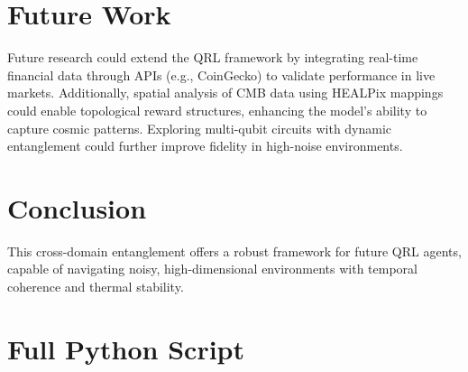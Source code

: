 \documentclass{article}
\begin{document}
\section{Future Work}
Future research could extend the QRL framework by integrating real-time financial data through APIs (e.g., CoinGecko) to validate performance in live markets. Additionally, spatial analysis of CMB data using HEALPix mappings could enable topological reward structures, enhancing the model’s ability to capture cosmic patterns. Exploring multi-qubit circuits with dynamic entanglement could further improve fidelity in high-noise environments.

\section{Conclusion}
This cross-domain entanglement offers a robust framework for future QRL agents, capable of navigating noisy, high-dimensional environments with temporal coherence and thermal stability.

\appendix
\section{Full Python Script}


\clearpage
\printbibliography
\end{document}
